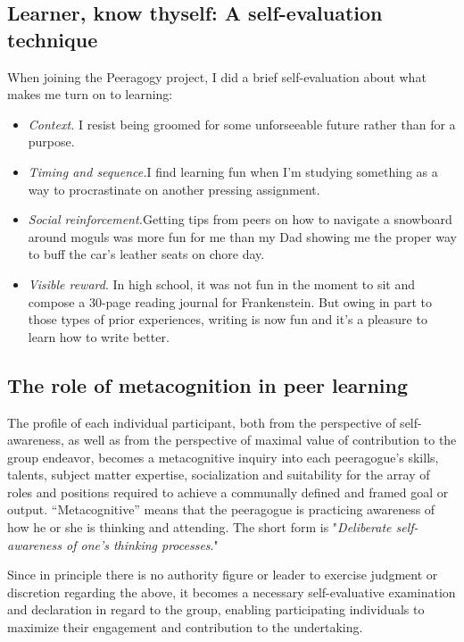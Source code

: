 \subsection{Learner, know thyself: A self-evaluation technique}

When joining the Peeragogy project, I did a brief self-evaluation about
what makes me turn on to learning:

\begin{itemize}
\item
  \emph{Context.} I resist being groomed for some unforseeable future
  rather than for a purpose.
\item
  \emph{Timing and sequence.}I find learning fun when I'm studying
  something as a way to procrastinate on another pressing assignment.
\item
  \emph{Social reinforcement.}Getting tips from peers on how to navigate
  a snowboard around moguls was more fun for me than my Dad showing me
  the proper way to buff the car's leather seats on chore day.
\item
  \emph{Visible reward}. In high school, it was not fun in the moment to
  sit and compose a 30-page reading journal for Frankenstein. But owing
  in part to those types of prior experiences, writing is now fun and
  it's a pleasure to learn how to write better.
\end{itemize}

\subsection{The role of metacognition in peer learning}

The profile of each individual participant, both from the perspective of
self-awareness, as well as from the perspective of maximal value of
contribution to the group endeavor, becomes a metacognitive inquiry into
each peeragogue's skills, talents, subject matter expertise,
socialization and suitability for the array of roles and positions
required to achieve a communally defined and framed goal or output.
``Metacognitive'' means that the peeragogue is practicing awareness of
how he or she is thinking and attending. The short form is
"\emph{Deliberate self-awareness of one's thinking processes}."

Since in principle there is no authority figure or leader to exercise
judgment or discretion regarding the above, it becomes a necessary
self-evaluative examination and declaration in regard to the group,
enabling participating individuals to maximize their engagement and
contribution to the undertaking.

